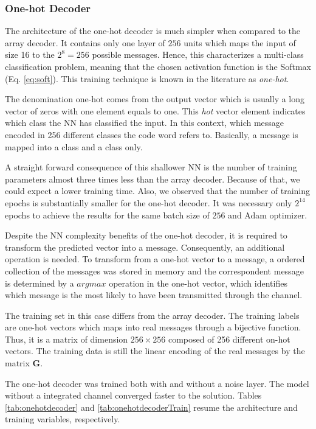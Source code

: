 \documentclass[conference]{IEEEtran}
\begin{document}
\subsubsection{One-hot Decoder}

The architecture of the one-hot decoder is much simpler when compared to the array decoder. It contains only one layer of $256$ units which maps the input of size 16 to the $2^8=256$ possible messages. Hence, this characterizes a multi-class classification problem, meaning that the chosen activation function is the Softmax (Eq. \ref{eq:soft}). This training technique is known in the literature as \textit{one-hot}. 

The denomination one-hot comes from the output vector which is usually a long vector of zeros with one element equals to one. This \textit{hot} vector element indicates which class the NN has classified the input. In this context, which message encoded in 256 different classes the code word refers to. Basically, a message is mapped into a class and a class only.

A straight forward consequence of this shallower NN is the number of training parameters almost three times less than the array decoder. Because of that, we could expect a lower training time. Also, we observed that the number of training epochs is substantially smaller for the one-hot decoder. It was necessary only $2^{14}$ epochs to achieve the results for the same batch size of $256$ and Adam optimizer.

Despite the NN complexity benefits of the one-hot decoder, it is required to transform the predicted vector into a message. Consequently, an additional operation is needed. To transform from a one-hot vector to a message, a ordered collection of the messages was stored in memory and the correspondent message is determined by a $argmax$ operation in the one-hot vector, which identifies which message is the most likely to have been transmitted through the channel.

The training set in this case differs from the array decoder. The training labels are one-hot vectors which maps into real messages through a bijective function. Thus, it is a matrix of dimension $256\times256$ composed of 256 different on-hot vectors. The training data is still the linear encoding of the real messages by the matrix $\textbf{G}$. 

The one-hot decoder was trained both with and without a noise layer. The model without a integrated channel converged faster to the solution. Tables \ref{tab:onehotdecoder} and \ref{tab:onehotdecoderTrain} resume the architecture and training variables, respectively.
\end{document}
